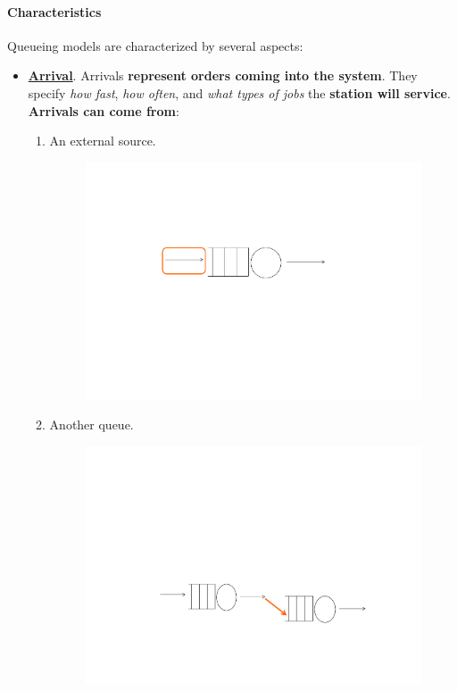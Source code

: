 \newpage

\paragraph{Characteristics}

Queueing models are characterized by several aspects:
\begin{itemize}
	\item \textbf{\underline{Arrival}}. Arrivals \textbf{represent orders coming into the system}. They specify \emph{how fast}, \emph{how often}, and \emph{what types of jobs} the \textbf{station will service}. \textbf{Arrivals can come from}:
	\begin{enumerate}
		\item An external source.
		\begin{figure}[!htp]
			\centering
			\includegraphics[width=.6\textwidth]{img/queueing-network-2.pdf}
		\end{figure}
		
		\item Another queue.
		\begin{figure}[!htp]
			\centering
			\includegraphics[width=.8\textwidth]{img/queueing-network-3.pdf}
		\end{figure}
		

\end{enumerate}
\end{itemize}
